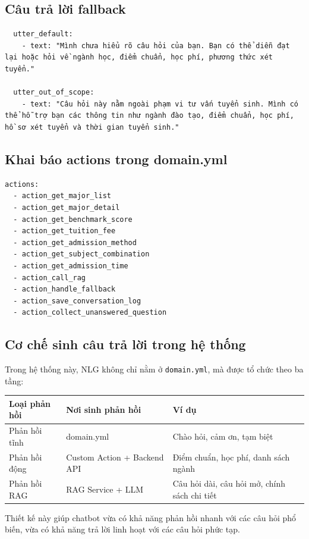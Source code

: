 \subsection*{Câu trả lời fallback}

\begin{verbatim}
  utter_default:
    - text: "Mình chưa hiểu rõ câu hỏi của bạn. Bạn có thể diễn đạt lại hoặc hỏi về ngành học, điểm chuẩn, học phí, phương thức xét tuyển."

  utter_out_of_scope:
    - text: "Câu hỏi này nằm ngoài phạm vi tư vấn tuyển sinh. Mình có thể hỗ trợ bạn các thông tin như ngành đào tạo, điểm chuẩn, học phí, hồ sơ xét tuyển và thời gian tuyển sinh."
\end{verbatim}

\subsection*{Khai báo actions trong domain.yml}

\begin{verbatim}
actions:
  - action_get_major_list
  - action_get_major_detail
  - action_get_benchmark_score
  - action_get_tuition_fee
  - action_get_admission_method
  - action_get_subject_combination
  - action_get_admission_time
  - action_call_rag
  - action_handle_fallback
  - action_save_conversation_log
  - action_collect_unanswered_question
\end{verbatim}

\subsection*{Cơ chế sinh câu trả lời trong hệ thống}

Trong hệ thống này, NLG không chỉ nằm ở \texttt{domain.yml}, mà được tổ chức theo ba tầng:

\begin{table}[H]
\centering
\begin{tabular}{|l|l|p{6cm}|}
\hline
\textbf{Loại phản hồi} & \textbf{Nơi sinh phản hồi} & \textbf{Ví dụ} \\
\hline
Phản hồi tĩnh & domain.yml & Chào hỏi, cảm ơn, tạm biệt \\
\hline
Phản hồi động & Custom Action + Backend API & Điểm chuẩn, học phí, danh sách ngành \\
\hline
Phản hồi RAG & RAG Service + LLM & Câu hỏi dài, câu hỏi mở, chính sách chi tiết \\
\hline
\end{tabular}
\end{table}

Thiết kế này giúp chatbot vừa có khả năng phản hồi nhanh với các câu hỏi phổ biến, vừa có khả năng trả lời linh hoạt với các câu hỏi phức tạp.
